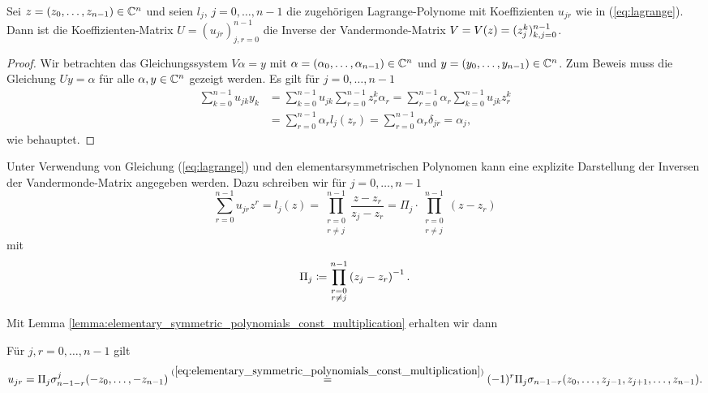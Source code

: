 \begin{lemma}
    \label{lemma:vandermonde-inversion}
    Sei $z = (z_0, \dots, z_{n-1}) \in \mathbb{C}^n$ und seien
    $l_j$, $j = 0, \dots, n-1$ die zugehörigen Lagrange-Polynome
    mit Koeffizienten $u_{jr}$ wie in (\ref{eq:lagrange}).
    Dann ist die Koeffizienten-Matrix $U = (u_{jr})_{j,r = 0}^{n-1}$ die
    Inverse der Vandermonde-Matrix $V = V \! \left( z \right) = (z_{j}^{k})_{k,j = 0}^{n-1}$.
\end{lemma}
\begin{proof}
    Wir betrachten das Gleichungssystem $V \alpha = y$ mit
    $\alpha = (\alpha_0, \dots, \alpha_{n-1}) \in \mathbb{C}^n$
    und $y = (y_0, \dots, y_{n-1}) \in \mathbb{C}^n$.
    Zum Beweis muss die Gleichung $U y = \alpha$ für alle $\alpha,  y \in \mathbb{C}^n$
    gezeigt werden.
    Es gilt für $j = 0, \dots, n-1$
    \[
        \begin{split}
            \sum_{k=0}^{n-1} u_{jk} y_k &= \sum_{k=0}^{n-1} u_{jk} \sum_{r=0}^{n-1} z_r^k \alpha_r = \sum_{r=0}^{n-1} \alpha_r \sum_{k=0}^{n-1} u_{jk} z_r^k\\
                                        &= \sum_{r=0}^{n-1} \alpha_r l_j(z_r) = \sum_{r=0}^{n-1} \alpha_r \delta_{jr} = \alpha_j,
        \end{split}
    \]
    wie behauptet.
\end{proof}

Unter Verwendung von Gleichung (\ref{eq:lagrange}) und den
elementarsymmetrischen Polynomen kann eine explizite Darstellung der
Inversen der Vandermonde-Matrix angegeben werden.
Dazu schreiben wir für $j = 0, \dots, n-1$
\begin{equation*}
    \sum_{r = 0}^{n-1} u_{jr} z^{r}
    = l_j(z)
    = \prod_{\substack{r=0\\ r \neq j}}^{n-1} \frac{z - z_r}{z_j - z_r}
    = \Pi_j \cdot \prod_{\substack{r=0\\ r \neq j}}^{n-1} \left( z - z_r \right)
\end{equation*}
mit
\begin{equation}
    \label{def:pi_j}
    \Pi_j \coloneqq \prod_{\substack{r=0\\ r \neq j}}^{n-1} \left( z_j - z_r \right)^{-1}.
\end{equation}

\noindent Mit Lemma
\ref{lemma:elementary_symmetric_polynomials_const_multiplication} erhalten
wir dann
\begin{lemma}
    Für $j, r = 0, \dots, n-1$ gilt
    \begin{equation}
        \label{eq:explicit_inverse_vandermonde}
        u_{jr}
        = \Pi_j \sigma_{n-1-r}^{j}(-z_0, \dots, -z_{n-1})
        \overset{(\ref{eq:elementary_symmetric_polynomials_const_multiplication})}{=}
          (-1)^r \Pi_j \sigma_{n-1-r}(z_0, \dots, z_{j-1}, z_{j+1}, \dots, z_{n-1}).
    \end{equation}
\end{lemma}

